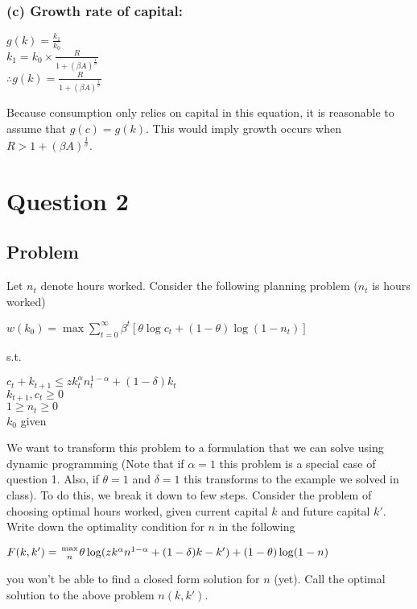 \documentclass[10pt, a4paper]{article}
\begin{document}
    \subsubsection{(c) Growth rate of capital:}
    \begin{center}
      $g(k) = \frac{k_1}{k_0}$ \\
      $k_1 = k_0\times\frac{R}{1+(\beta A)^{\frac{1}{\sigma}}}$ \\
      $\therefore g(k) = \frac{R}{1+(\beta A)^{\frac{1}{\sigma}}}$ \\
    \end{center}
    Because consumption only relies on capital in this equation, it is reasonable to assume that $g(c)=g(k)$. This would imply growth occurs when $R>1+(\beta A)^{\frac{1}{\sigma}}$.
\section*{Question 2}
  \subsection*{Problem}
    Let $n_t$ denote hours worked. Consider the following planning problem ($n_t$ is hours worked)
    \begin{center}
      $w(k_0) = \max\sum_{t=0}^{\infty}\beta^t[\theta\log c_t+(1-\theta)\log(1-n_t)]$
    \end{center}
    s.t.
    \begin{center}
      $c_t+k_{t+1}\leq zk_t^{\alpha}n_t^{1-\alpha}+(1-\delta)k_t$ \\
      $k_{t+1},c_t\geq 0$ \\
      $1\geq n_t\geq 0$ \\
      $k_0$ given
    \end{center}

    We want to transform this problem to a formulation that we can solve using dynamic programming (Note that if $\alpha=1$ this problem is a special case of question 1. Also, if $\theta=1$ and $\delta=1$ this transforms to the example we solved in class). To do this, we break it down to few steps. Consider the problem of choosing optimal hours worked, given current capital $k$ and future capital $k'$. Write down the optimality condition for $n$ in the following
    \begin{center}
      $F(k,k')={\max\atop{n}}\theta\log(zk^{\alpha}n^{1-\alpha}+(1-\delta)k-k')+(1-\theta)\log(1-n)$
    \end{center}
    you won't be able to find a closed form solution for $n$ (yet). Call the optimal solution to the above problem $n(k,k')$.
\end{document}
